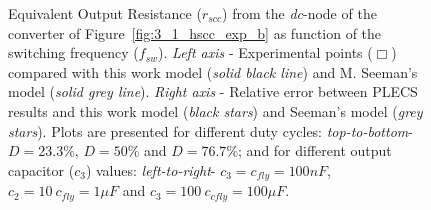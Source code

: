 \begin{figure}[!h]
\newcommand\pHeigh{3.25cm}
\newcommand\pWidth{2.5cm}
\centering
    \begin{subfigure}{\textwidth}
       \parbox[b]{.325\linewidth}{
            \raggedright
            
        }
       \parbox[b]{.325\linewidth}{
            \raggedleft
            
        }
       \parbox[b]{.325\linewidth}{
            \centering
            
        }
    \end{subfigure}

    \begin{subfigure}{\textwidth}
       \parbox[b]{.325\linewidth}{
            \raggedright
            
        }
       \parbox[b]{.325\linewidth}{
            \raggedleft
            
        }
       \parbox[b]{.325\linewidth}{
            \centering
            
        }
    \end{subfigure}

    \begin{subfigure}{\textwidth}
       \parbox[b]{.325\linewidth}{
            \raggedright
            
        }
       \parbox[b]{.325\linewidth}{
            \raggedleft
            
        }
       \parbox[b]{.325\linewidth}{
            \centering
            
        }
    \end{subfigure}

\caption{Equivalent Output Resistance ($r_{scc}$) from the \emph{dc}-node of the converter of Figure~\ref{fig:3_1_hscc_exp_b} as function of the switching frequency ($f_{sw}$). \emph{Left axis} - Experimental points ($\Box$) compared with this work model (\emph{solid black line}) and M. Seeman's model (\emph{solid grey line}). \emph{Right axis} - Relative error between PLECS results and this work model (\emph{black stars}) and Seeman's model (\emph{grey stars}). Plots are presented for different duty cycles: \emph{top-to-bottom}- $D = 23.3\%$, $D = 50\%$ and $D = 76.7\%$; and for different output capacitor ($c_3$) values: \emph{left-to-right}- $c_3 = c_{fly} = 100nF$, $c_2 = 10~c_{fly} = 1\mu F$ and $c_3 = 100~c_{cfly} = 100\mu F$.}
\label{fig:exp_rscc_dc_node}
\end{figure}

